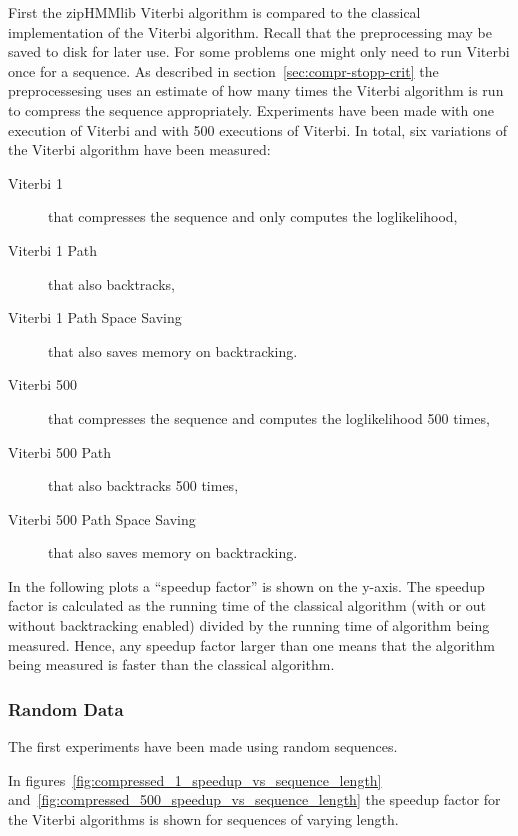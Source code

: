 First the zipHMMlib Viterbi algorithm is compared to the classical
implementation of the Viterbi algorithm. Recall that the preprocessing may be
saved to disk for later use. For some problems one might only need to run
Viterbi once for a sequence. As described in section~\ref{sec:compr-stopp-crit}
the preprocessesing uses an estimate of how many times the Viterbi algorithm is
run to compress the sequence appropriately. Experiments have been made with one
execution of Viterbi and with 500 executions of Viterbi. In total, six
variations of the Viterbi algorithm have been measured:
\begin{description}
\item[Viterbi 1] that compresses the sequence and only computes the
  loglikelihood,
\item[Viterbi 1 Path] that also backtracks,
\item[Viterbi 1 Path Space Saving] that also saves memory on backtracking.
\item[Viterbi 500] that compresses the sequence and computes the
  loglikelihood 500 times,
\item[Viterbi 500 Path] that also backtracks 500 times,
\item[Viterbi 500 Path Space Saving] that also saves memory on backtracking.
\end{description}

In the following plots a ``speedup factor'' is shown on the y-axis. The speedup
factor is calculated as the running time of the classical algorithm (with or
out without backtracking enabled) divided by the running time of algorithm
being measured. Hence, any speedup factor larger than one means that the
algorithm being measured is faster than the classical algorithm.

\subsubsection{Random Data}

The first experiments have been made using random sequences.

In figures~\ref{fig:compressed_1_speedup_vs_sequence_length}
and~\ref{fig:compressed_500_speedup_vs_sequence_length} the speedup factor for
the Viterbi algorithms is shown for sequences of varying length. 

